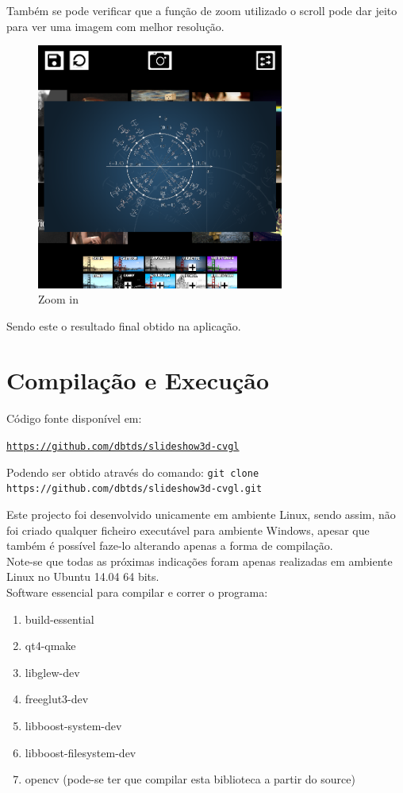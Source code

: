 \documentclass[portugues,final]{revdetua}
\begin{document}
Também se pode verificar que a função de zoom utilizado o scroll pode dar jeito para ver uma imagem com melhor resolução.

\begin{figure}[H]
\centerline{\includegraphics[width=230pt]{images/zoom.png}}
\caption{Zoom in}
\label{img:complete}
\end{figure}

Sendo este o resultado final obtido na aplicação.

\section{Compilação e Execução}

Código fonte disponível em:

{\tt \url{https://github.com/dbtds/slideshow3d-cvgl}}

Podendo ser obtido através do comando: {\tt git clone https://github.com/dbtds/slideshow3d-cvgl.git}

Este projecto foi desenvolvido unicamente em ambiente Linux, sendo assim, não foi criado qualquer ficheiro executável para ambiente Windows, apesar que também é possível faze-lo alterando apenas a forma de compilação.\\

Note-se que todas as próximas indicações foram apenas realizadas em ambiente Linux no Ubuntu 14.04 64 bits.\\

Software essencial para compilar e correr o programa:
\begin{enumerate}
\item build-essential
\item qt4-qmake
\item libglew-dev
\item freeglut3-dev
\item libboost-system-dev
\item libboost-filesystem-dev
\item opencv (pode-se ter que compilar esta biblioteca a partir do source)
\end{enumerate}
\end{document}
